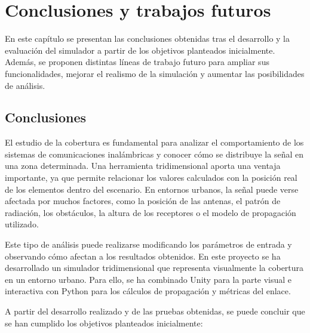 \chapter{Conclusiones y trabajos futuros}
\label{chap:conclusiones}

En este capítulo se presentan las conclusiones obtenidas tras el desarrollo y la evaluación del simulador a partir de los objetivos planteados inicialmente. Además, se proponen distintas líneas de trabajo futuro para ampliar sus funcionalidades, mejorar el realismo de la simulación y aumentar las posibilidades de análisis.


\section{Conclusiones}

El estudio de la cobertura es fundamental para analizar el comportamiento de los sistemas de comunicaciones inalámbricas y conocer cómo se distribuye la señal en una zona determinada. Una herramienta tridimensional aporta una ventaja importante, ya que permite relacionar los valores calculados con la posición real de los elementos dentro del escenario. En entornos urbanos, la señal puede verse afectada por muchos factores, como la posición de las antenas, el patrón de radiación, los obstáculos, la altura de los receptores o el modelo de propagación utilizado.

Este tipo de análisis puede realizarse modificando los parámetros de entrada y observando cómo afectan a los resultados obtenidos. En este proyecto se ha desarrollado un simulador tridimensional que representa visualmente la cobertura en un entorno urbano. Para ello, se ha combinado Unity para la parte visual e interactiva con Python para los cálculos de propagación y métricas del enlace.

A partir del desarrollo realizado y de las pruebas obtenidas, se puede concluir que se han cumplido los objetivos planteados inicialmente:


